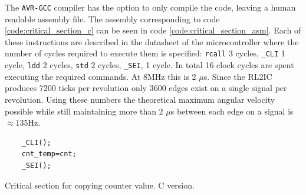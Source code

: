 The \texttt{AVR-GCC} compiler has the option to only compile the code, leaving a human readable assembly file.
The assembly corresponding to code \ref{code:critical_section_c} can be seen in code \ref{code:critical_section_asm}.
Each of these instructions are described in the datasheet of the microcontroller where the number of cycles required to execute them is specified: \texttt{rcall} 3 cycles, \texttt{\_CLI} 1 cycle, \texttt{ldd} 2 cycles, \texttt{std} 2 cycles, \texttt{\_SEI}, 1 cycle.
In total 16 clock cycles are spent executing the required commands.
At 8MHz this is 2 $\mu$s.
Since the RL2IC produces 7200 ticks per revolution only 3600 edges exist on a single signal per revolution. 
Using these numbers the theoretical maximum angular velocity possible while still maintaining more than 2 $\mu$s between each edge on a signal is $\approx$135Hz.
\begin{listing}[h] 
\begin{verbatim}
	_CLI();
	cnt_temp=cnt;
	_SEI();
\end{verbatim}
\caption{Critical section for copying counter value. C version.}
\label{code:critical_section_c}
\end{listing}

